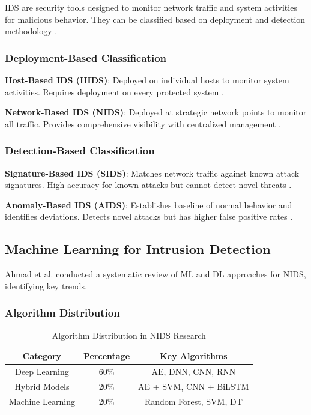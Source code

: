\documentclass[12pt,a4paper]{article}
\begin{document}
IDS are security tools designed to monitor network traffic and system activities for malicious behavior. They can be classified based on deployment and detection methodology \cite{ahmad2021network}.

\subsubsection{Deployment-Based Classification}

\textbf{Host-Based IDS (HIDS)}: Deployed on individual hosts to monitor system activities. Requires deployment on every protected system \cite{verma2020machine}.

\textbf{Network-Based IDS (NIDS)}: Deployed at strategic network points to monitor all traffic. Provides comprehensive visibility with centralized management \cite{li2019machine}.

\subsubsection{Detection-Based Classification}

\textbf{Signature-Based IDS (SIDS)}: Matches network traffic against known attack signatures. High accuracy for known attacks but cannot detect novel threats \cite{axelson2000intrusion}.

\textbf{Anomaly-Based IDS (AIDS)}: Establishes baseline of normal behavior and identifies deviations. Detects novel attacks but has higher false positive rates \cite{garcia2009anomaly}.

\subsection{Machine Learning for Intrusion Detection}

Ahmad et al. \cite{ahmad2021network} conducted a systematic review of ML and DL approaches for NIDS, identifying key trends.

\subsubsection{Algorithm Distribution}

\begin{table}[H]
\centering
\caption{Algorithm Distribution in NIDS Research}
\label{tab:algorithm_distribution}
\begin{tabular}{|c|c|c|}
\hline
\textbf{Category} & \textbf{Percentage} & \textbf{Key Algorithms} \\
\hline
Deep Learning & 60\% & AE, DNN, CNN, RNN \\
Hybrid Models & 20\% & AE + SVM, CNN + BiLSTM \\
Machine Learning & 20\% & Random Forest, SVM, DT \\
\hline
\end{tabular}
\end{table}
\end{document}
